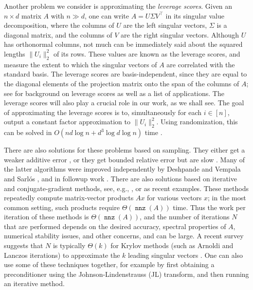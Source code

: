 \documentclass{sig-alternate}
\DeclareMathOperator{\nnz}{\mathtt{nnz}}
\begin{document}
Another problem we consider is approximating the {\it leverage scores}. 
Given an $n \times d$ matrix $A$ with $n \gg d$, one can write
$A = U \Sigma V^\top $ in its singular value decomposition, where the columns of $U$ are the left singular vectors,
$\Sigma$ is a diagonal matrix, and the columns of $V$ are the right singular vectors. Although $U$
has orthonormal columns, not much can be immediately said about the squared lengths $\|U_i\|_2^2$ of its rows.
These values are known as the leverage scores, and measure the extent to which the singular vectors of $A$ 
are correlated with the standard basis. The leverage scores are basis-independent, since
they are equal to the diagonal elements of the projection matrix onto the
span of the columns of $A$; see \cite{DMMW12} for background on leverage scores 
as well as a list of applications. 
The leverage scores will also play a crucial role in our work, as we shall see. 
The goal of approximating the leverage scores is to, 
simultaneously for each $i \in [n]$, output a constant factor approximation to $\|U_i\|_2^2$. 
Using randomization, this can be solved in $O(nd \log n + d^3 \log d \log n)$ time \cite{DMMW12}.

There are also solutions for these problems based on sampling. They either get a weaker additive error
\cite{fkv04,prtv00,am07,dkm06,dkm06a,dkm06b,dm05,rv07,drvw06},
or they get bounded relative error but are slow \cite{dv06,dmm06,dmm06b,dmm06c}.
Many of the latter algorithms
were improved independently by Deshpande and Vempala \cite{dv06} and Sarl\'os \cite{s06}, and in followup work
\cite{dmms11,ndt09,mz11}. 
There are also solutions based on iterative and conjugate-gradient methods, see, e.g., \cite{tb_nla},
or \cite{zf12} as recent examples. These methods repeatedly compute matrix-vector products
$Ax$ for various vectors $x$; in the most common setting, such products require $\Theta(\nnz(A))$
time. Thus the work per iteration of these methods is $\Theta(\nnz(A))$,
and the number of iterations $N$ that are performed depends on the desired accuracy,
spectral properties of $A$, numerical stability issues, and other concerns,
and can be large. A recent survey suggests that $N$ is typically $\Theta(k)$
for Krylov methods (such as Arnoldi
and Lanczos iterations) to approximate
the $k$ leading singular vectors \cite{HMT}.
One can also use some of these techniques together, for example by first obtaining a preconditioner using the
Johnson-Lindenstrauss (JL) transform, and then running an iterative method. 
\end{document}
